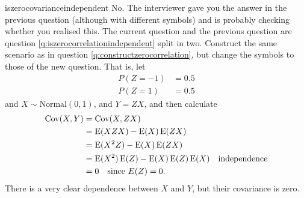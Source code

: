 \begin{answer}{iszerocovarianceindependent}
No. The interviewer gave you the answer in the previous question
(although with different symbols)
and is probably checking whether you realised this.
The current question and the previous question are question \ref{q:iszerocorrelationindependent} split in two.
Construct the same scenario as in question \ref{q:constructzerocorrelation}, but change the symbols to those of the new question.
That is, let
\begin{align*}
P(Z = -1) &= 0.5  \\
P(Z =  1) &= 0.5
\end{align*}
and
$X \sim \text{Normal}(0,1)$, and
$Y = ZX$,
and then calculate
\begin{align*}
\operatorname{\mathrm{Cov}}(X,Y)
&= \operatorname{\mathrm{Cov}}(X, ZX) \\
&= \operatorname{\mathrm{E}}(XZX) - \operatorname{\mathrm{E}}(X) \operatorname{\mathrm{E}}(ZX)  \\
&= \operatorname{\mathrm{E}}(X^2 Z) - \operatorname{\mathrm{E}}(X) \operatorname{\mathrm{E}}(ZX)  \\
&= \operatorname{\mathrm{E}}(X^2) \operatorname{\mathrm{E}}(Z) - \operatorname{\mathrm{E}}(X)\operatorname{\mathrm{E}}(Z)\operatorname{\mathrm{E}}(X)   \quad \text{independence} \\
&=  0                                \quad \text{since } E(Z)=0
\text{.}
\end{align*}
There is a very clear dependence between $X$ and $Y$, but their covariance is zero.
\end{answer}
